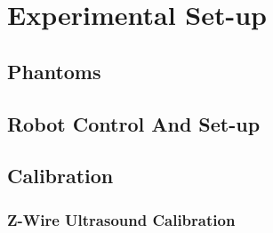  
\chapter{Experimental Set-up}
\section{Phantoms}
\section{Robot Control And Set-up}
\section{Calibration}
\subsection{Z-Wire Ultrasound Calibration}